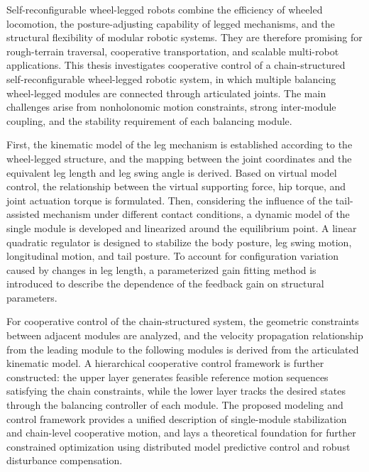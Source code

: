 \begin{abstractEn}
Self-reconfigurable wheel-legged robots combine the efficiency of wheeled locomotion, the posture-adjusting capability of legged mechanisms, and the structural flexibility of modular robotic systems. They are therefore promising for rough-terrain traversal, cooperative transportation, and scalable multi-robot applications. This thesis investigates cooperative control of a chain-structured self-reconfigurable wheel-legged robotic system, in which multiple balancing wheel-legged modules are connected through articulated joints. The main challenges arise from nonholonomic motion constraints, strong inter-module coupling, and the stability requirement of each balancing module.

First, the kinematic model of the leg mechanism is established according to the wheel-legged structure, and the mapping between the joint coordinates and the equivalent leg length and leg swing angle is derived. Based on virtual model control, the relationship between the virtual supporting force, hip torque, and joint actuation torque is formulated. Then, considering the influence of the tail-assisted mechanism under different contact conditions, a dynamic model of the single module is developed and linearized around the equilibrium point. A linear quadratic regulator is designed to stabilize the body posture, leg swing motion, longitudinal motion, and tail posture. To account for configuration variation caused by changes in leg length, a parameterized gain fitting method is introduced to describe the dependence of the feedback gain on structural parameters.

For cooperative control of the chain-structured system, the geometric constraints between adjacent modules are analyzed, and the velocity propagation relationship from the leading module to the following modules is derived from the articulated kinematic model. A hierarchical cooperative control framework is further constructed: the upper layer generates feasible reference motion sequences satisfying the chain constraints, while the lower layer tracks the desired states through the balancing controller of each module. The proposed modeling and control framework provides a unified description of single-module stabilization and chain-level cooperative motion, and lays a theoretical foundation for further constrained optimization using distributed model predictive control and robust disturbance compensation.
\end{abstractEn}
